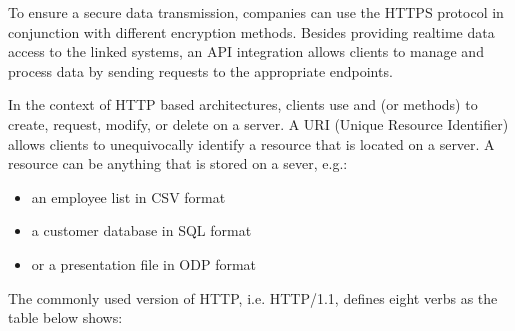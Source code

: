 \documentclass[a4paper,10pt,english,openany,oneside]{sphinxmanual}
\begin{document}
\sphinxAtStartPar
To ensure a secure data transmission, companies can use the HTTPS protocol in conjunction with different encryption methods.
Besides providing real\sphinxhyphen{}time data access to the linked systems, an API integration allows clients to manage and process data by sending requests to the appropriate endpoints.

\sphinxAtStartPar
In the context of HTTP based architectures, clients use  and  (or methods) to create, request, modify, or delete  on a server. A URI (Unique Resource Identifier) allows clients to unequivocally identify a resource that is located on a server. A resource can be anything that is stored on a sever, e.g.:
\begin{itemize}
\item {} 
\sphinxAtStartPar
an employee list in CSV format

\item {} 
\sphinxAtStartPar
a customer database in SQL format

\item {} 
\sphinxAtStartPar
or a presentation file in ODP format

\end{itemize}

\sphinxAtStartPar
The commonly used version of HTTP, i.e. HTTP/1.1, defines eight verbs as the table below shows:
\end{document}
